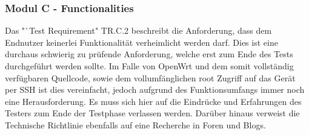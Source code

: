 \documentclass[a4paper]{book}
\begin{document}
\begin{large}
\subsubsection{Modul C - Functionalities}
\begin{onehalfspace}
Das "`Test Requirement"{} TR.C.2 beschreibt die Anforderung, dass dem Endnutzer keinerlei Funktionalität verheimlicht werden darf. Dies ist eine durchaus schwierig zu prüfende Anforderung, welche erst zum Ende des Tests durchgeführt werden sollte. Im Falle von OpenWrt und dem somit vollständig verfügbaren Quellcode, sowie dem vollumfänglichen root Zugriff auf das Gerät per SSH ist dies vereinfacht, jedoch aufgrund des Funktionsumfangs immer noch eine Herausforderung. Es muss sich hier auf die Eindrücke und Erfahrungen des Testers zum Ende der Testphase verlassen werden. Darüber hinaus verweist die Technische Richtlinie ebenfalls auf eine Recherche in Foren und Blogs.
\end{onehalfspace}


\end{large}
\end{document}
